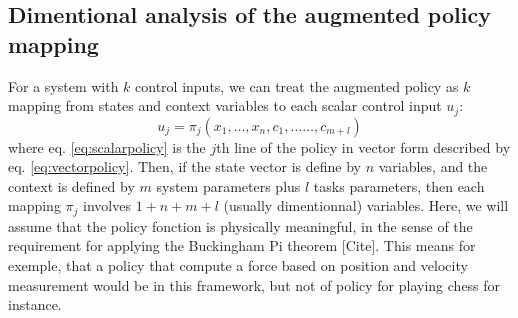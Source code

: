 \subsection{Dimentional analysis of the augmented policy mapping}

For a system with $k$ control inputs, we can treat the augmented policy as $k$ mapping from states and context variables to each scalar control input $u_j$:
\begin{equation}
u_j = \pi_j \left(
x_1, \hdots, x_n, 
c_1, \hdots \hdots, c_{m+l}
\right) 
\label{eq:scalarpolicy}
\end{equation}
where eq. \eqref{eq:scalarpolicy} is the $j$th line of the policy in vector form described by eq. \eqref{eq:vectorpolicy}.
Then, if the state vector is define by $n$ variables, and the context is defined by $m$ system parameters plus $l$ tasks parameters, then each mapping $\pi_j$ involves $1 + n + m + l$ (usually dimentionnal) variables. Here, we will assume that the policy fonction is physically meaningful, in the sense of the requirement for applying the Buckingham Pi theorem [Cite]. This means for exemple, that a policy that compute a force based on position and velocity measurement would be in this framework, but not of policy for playing chess for instance. 

